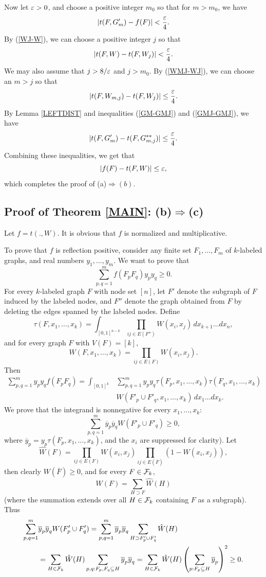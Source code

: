 \documentclass[fleqn]{article}
\begin{document}
Now let $\varepsilon>0$, and choose a positive integer $m_0$ so that for
$m>m_0$, we have
\[
|t(F,G'_m)-f(F)|<\frac{\varepsilon}{4}.
\]
By (\ref{WJ-W}), we can choose a positive integer $j$ so that
\[
|t(F,W)-t(F,W_j)|<\frac{\varepsilon}{4}.
\]
We may also assume that $j>8/\varepsilon$ and $j>m_0$. By (\ref{WMJ-WJ}), we
can choose an $m>j$ so that
\[
|t(F,W_{m,j})-t(F,W_j)|\le\frac{\varepsilon}{4}.
\]
By Lemma \ref{LEFTDIST} and inequalities (\ref{GM-GMJ}) and
(\ref{GMJ-GMJ}), we have
\[
|t(F,G'_m)-t(F,G^{**}_{m,j})|\le\frac{\varepsilon}{4}.
\]
Combining these inequalities, we get that
\[
|f(F)-t(F,W)|\le\varepsilon,
\]
which completes the proof of (a)$\Rightarrow(b)$.

\subsection{Proof of Theorem \ref{MAIN}: (b)$\Rightarrow$(c)}

Let $f=t(.,W)$. It is obvious that $f$ is normalized and
multiplicative.

To prove that $f$ is reflection positive, consider any finite set
$F_1,\dots,F_m$ of $k$-labeled graphs, and real numbers
$y_1,\dots,y_m$. We want to prove that
\[
\sum_{p,q=1}^m f(F_pF_q) y_py_q \ge 0.
\]
For every $k$-labeled graph $F$ with node set $[n]$, let $F'$ denote
the subgraph of $F$ induced by the labeled nodes, and $F''$ denote
the graph obtained from $F$ by deleting the edges spanned by the
labeled nodes. Define
\[
\tau(F,x_1,\dots,x_k)=\int_{[0,1]^{n-k}} \prod_{ij\in E(F'')}
W(x_i,x_j)\,dx_{k+1}\dots dx_n,
\]
and for every graph $F$ with $V(F)=[k]$,
\[
W(F,x_1,\dots,x_k)=\prod_{ij\in E(F)} W(x_i,x_j).
\]
Then
\begin{align*}
\sum_{p,q=1}^m y_py_q f(F_pF_q) = \int_{[0,1]^k}& \sum_{p,q=1}^m
y_p y_q\tau(F_p,x_1,\dots,x_k)\tau(F_q,x_1,\dots,x_k)\\
&W(F'_p\cup F'_q,x_1,\dots,x_k)\,dx_1\dots dx_k.
\end{align*}
We prove that the integrand is nonnegative for every $x_1,\dots,x_k$:
\[
\sum_{p,q=1}^m \overline{y}_p\overline{y}_qW(F'_p\cup F'_q)\ge 0,
\]
where $\overline{y}_p=y_p\tau(F_p,x_1,\dots,x_k)$, and the $x_i$ are
suppressed for clarity). Let
\[
\hat W(F)= \prod_{ij\in E(F)} W(x_i,x_j)\prod_{ij\in E(\overline{F})}
(1-W(x_i,x_j)),
\]
then clearly $W(\overline{F})\ge 0$, and for every $F\in{\cal F}_k$,
\[
W(F)=\sum_{H\supset F} \hat W(H)
\]
(where the summation extends over all $H\in{\cal F}_k$ containing $F$ as a
subgraph). Thus
\begin{align*}
\sum_{p,q=1}^m &\overline{y}_p\overline{y}_qW(F'_p\cup F'_q) =
\sum_{p,q=1}^m \overline{y}_p\overline{y}_q \sum_{H\supset F'_p\cup
F'_q} \hat W(H)\\
&= \sum_{H\in{\cal F}_k}\hat W(H) \sum_{p,q: F_p,F_q\subseteq H}
\overline{y}_p\overline{y}_q =\sum_{H\in{\cal F}_k}\hat W(H)
\left(\sum_{p: F_p\subseteq H} \overline{y}_p\right)^2 \ge 0.
\end{align*}
\end{document}
